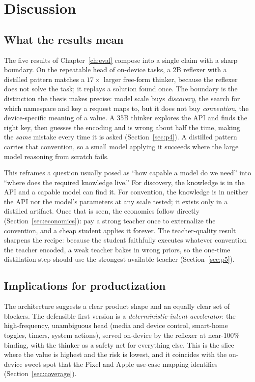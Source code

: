 \chapter{Discussion}
\label{ch:discussion}

\section{What the results mean}
\label{sec:d-meaning}

The five results of Chapter~\ref{ch:eval} compose into a single claim with a sharp
boundary. On the repeatable head of on-device tasks, a 2B reflexer with a
distilled pattern matches a $17\times$ larger free-form thinker, because the
reflexer does not solve the task; it replays a solution found once. The boundary
is the distinction the thesis makes precise: model scale buys \emph{discovery},
the search for which namespace and key a request maps to, but it does not buy
\emph{convention}, the device-specific meaning of a value. A 35B thinker explores
the API and finds the right key, then guesses the encoding and is wrong about half
the time, making the \emph{same} mistake every time it is asked
(Section~\ref{sec:p4}). A distilled pattern carries that convention, so a small
model applying it succeeds where the large model reasoning from scratch fails.

This reframes a question usually posed as ``how capable a model do we need'' into
``where does the required knowledge live.'' For discovery, the knowledge is in the
API and a capable model can find it. For convention, the knowledge is in neither
the API nor the model's parameters at any scale tested; it exists only in a
distilled artifact. Once that is seen, the economics follow directly
(Section~\ref{sec:economics}): pay a strong teacher once to externalize the
convention, and a cheap student applies it forever. The teacher-quality result
sharpens the recipe: because the student faithfully executes whatever convention
the teacher encoded, a weak teacher bakes in wrong priors, so the one-time
distillation step should use the strongest available teacher
(Section~\ref{sec:p5}).

\section{Implications for productization}
\label{sec:d-product}

The architecture suggests a clear product shape and an equally clear set of
blockers. The defensible first version is a \emph{deterministic-intent
accelerator}: the high-frequency, unambiguous head (media and device control,
smart-home toggles, timers, system actions), served on-device by the reflexer at
near-100\% binding, with the thinker as a safety net for everything else. This is
the slice where the value is highest and the risk is lowest, and it coincides with
the on-device sweet spot that the Pixel and Apple use-case mapping identifies
(Section~\ref{sec:coverage}).

